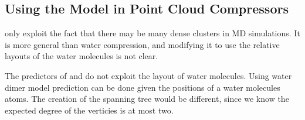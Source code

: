\documentclass[a4paper]{report}
\begin{document}
\subsection{Using the Model in Point Cloud Compressors}

\citep{omeltchenko2000sls} only exploit the fact that there may be many dense
clusters in MD simulations. It is more general than water compression, and
modifying it to use the relative layouts of the water molecules is not clear.

The predictors of \citep{merrycomp} and \citep{gumholdcomp} do not exploit the
layout of water molecules. Using water dimer model prediction can be done
given the positions of a water molecules atoms. The creation of the spanning
tree would be different, since we know the expected degree of the verticies is
at most two.
\end{document}
